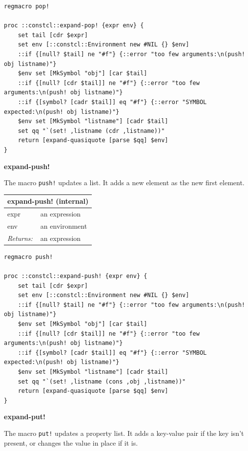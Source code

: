 \documentclass[twoside,9pt]{report}
\begin{document}
\noindent\makebox[\linewidth]{\rule{\linewidth}{0.4pt}}
\begin{lstlisting}
regmacro pop!
 
proc ::constcl::expand-pop! {expr env} {
    set tail [cdr $expr]
    set env [::constcl::Environment new #NIL {} $env]
    ::if {[null? $tail] ne "#f"} {::error "too few arguments:\n(push! obj listname)"}
    $env set [MkSymbol "obj"] [car $tail]
    ::if {[null? [cdr $tail]] ne "#f"} {::error "too few arguments:\n(push! obj listname)"}
    ::if {[symbol? [cadr $tail]] eq "#f"} {::error "SYMBOL expected:\n(push! obj listname)"}
    $env set [MkSymbol "listname"] [cadr $tail]
    set qq "`(set! ,listname (cdr ,listname))"
    return [expand-quasiquote [parse $qq] $env]
}
\end{lstlisting}
\noindent\makebox[\linewidth]{\rule{\linewidth}{0.4pt}}

\textbf{expand-push!}


The macro \texttt{push!} updates a list. It adds a new element as the new first element.

\begin{tabular}{ |l l| }
\hline
\multicolumn{2}{|l|}{expand-push! (internal)} \\
\hline
expr & an expression \\
env & an environment \\
\textit{Returns:} & an expression \\
\hline
\end{tabular}

\noindent\makebox[\linewidth]{\rule{\linewidth}{0.4pt}}
\begin{lstlisting}
regmacro push!
 
proc ::constcl::expand-push! {expr env} {
    set tail [cdr $expr]
    set env [::constcl::Environment new #NIL {} $env]
    ::if {[null? $tail] ne "#f"} {::error "too few arguments:\n(push! obj listname)"}
    $env set [MkSymbol "obj"] [car $tail]
    ::if {[null? [cdr $tail]] ne "#f"} {::error "too few arguments:\n(push! obj listname)"}
    ::if {[symbol? [cadr $tail]] eq "#f"} {::error "SYMBOL expected:\n(push! obj listname)"}
    $env set [MkSymbol "listname"] [cadr $tail]
    set qq "`(set! ,listname (cons ,obj ,listname))"
    return [expand-quasiquote [parse $qq] $env]
}
\end{lstlisting}
\noindent\makebox[\linewidth]{\rule{\linewidth}{0.4pt}}

\textbf{expand-put!}


The macro \texttt{put!} updates a property list. It adds a key-value pair if the key isn't present, or changes the value in place if it is.
\end{document}
